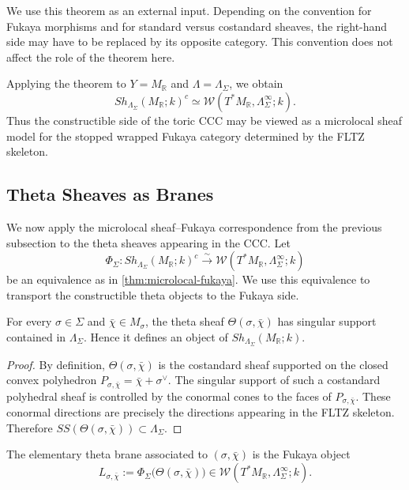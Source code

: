We use this theorem as an external input. Depending on the convention for
Fukaya morphisms and for standard versus costandard sheaves, the right-hand
side may have to be replaced by its opposite category. This convention does
not affect the role of the theorem here.

Applying the theorem to \(Y=M_{\mathbb R}\) and
\(\Lambda=\Lambda_\Sigma\), we obtain
\[
Sh_{\Lambda_\Sigma}(M_{\mathbb R};k)^c
\simeq
\mathcal W(T^*M_{\mathbb R},\Lambda_\Sigma^\infty;k).
\]
Thus the constructible side of the toric CCC may be viewed as a microlocal
sheaf model for the stopped wrapped Fukaya category determined by the FLTZ
skeleton.

\subsection{Theta Sheaves as Branes}

We now apply the microlocal sheaf--Fukaya correspondence from the previous
subsection to the theta sheaves appearing in the CCC. Let
\[
\Phi_\Sigma:
Sh_{\Lambda_\Sigma}(M_{\mathbb R};k)^c
\xrightarrow{\sim}
\mathcal W(T^*M_{\mathbb R},\Lambda_\Sigma^\infty;k)
\]
be an equivalence as in \cref{thm:microlocal-fukaya}. We use this equivalence to transport
the constructible theta objects to the Fukaya side.

\begin{lemma}
For every \(\sigma\in\Sigma\) and \(\bar\chi\in M_\sigma\), the theta sheaf
\(\Theta(\sigma,\bar\chi)\) has singular support contained in
\(\Lambda_\Sigma\). Hence it defines an object of
\(Sh_{\Lambda_\Sigma}(M_{\mathbb R};k)\).
\end{lemma}

\begin{proof}
By definition, \(\Theta(\sigma,\bar\chi)\) is the costandard sheaf supported
on the closed convex polyhedron
\(P_{\sigma,\bar\chi}=\bar\chi+\sigma^\vee\). The singular support of such a
costandard polyhedral sheaf is controlled by the conormal cones to the faces
of \(P_{\sigma,\bar\chi}\). These conormal directions are precisely the
directions appearing in the FLTZ skeleton. Therefore
\(SS(\Theta(\sigma,\bar\chi))\subset\Lambda_\Sigma\).
\end{proof}

\begin{definition}
The elementary theta brane associated to \((\sigma,\bar\chi)\) is the Fukaya
object
\[
L_{\sigma,\bar\chi}
:=
\Phi_\Sigma\bigl(\Theta(\sigma,\bar\chi)\bigr)
\in
\mathcal W(T^*M_{\mathbb R},\Lambda_\Sigma^\infty;k).
\]
\end{definition}


